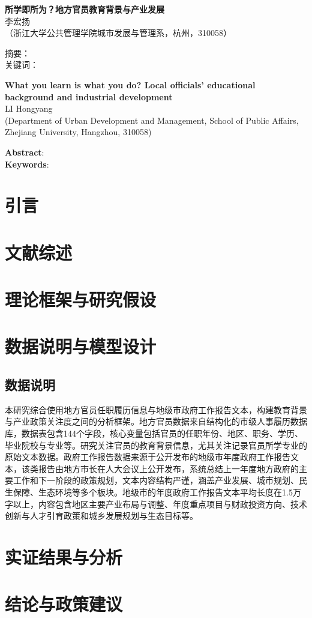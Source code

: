 \documentclass[a4paper,11pt, fontset=fandol]{ctexart}
\newcommand*{\TNR}{\CJKfamily{TNR}}
\newcommand{\sanhao}{\fontsize{15.75pt}{\baselineskip}\selectfont}
\newcommand{\sihao}{\fontsize{14pt}{\baselineskip}\selectfont}
\newcommand{\wuhao}{\fontsize{10.5pt}{\baselineskip}\selectfont}
\begin{document}
\begin{center}
\textbf{\sanhao 所学即所为？地方官员教育背景与产业发展} \\
\kaishu \wuhao 李宏扬 \\
\songti （浙江大学公共管理学院城市发展与管理系，杭州，310058）\\
\end{center}
\heiti \noindent 摘要： \songti \\
\heiti \noindent 关键词：\songti 


\begin{center}
\textbf{\TNR\sihao What you learn is what you do? Local officials' educational background and industrial development} \\
\wuhao LI Hongyang \\
(Department of Urban Development and Management, School of Public Affairs, Zhejiang University, Hangzhou, 310058) 
\end{center}
\noindent \textbf{Abstract}: \\
\noindent \textbf{Keywords}: 

\newpage
\tableofcontents
\newpage
\songti

\section{引言}

\section{文献综述}

\section{理论框架与研究假设}

\section{数据说明与模型设计}
\subsection{数据说明}
本研究综合使用地方官员任职履历信息与地级市政府工作报告文本，构建教育背景与产业政策关注度之间的分析框架。地方官员数据来自结构化的市级人事履历数据库，数据表包含144个字段，核心变量包括官员的任职年份、地区、职务、学历、毕业院校与专业等。研究关注官员的教育背景信息，尤其关注记录官员所学专业的原始文本数据。政府工作报告数据来源于公开发布的地级市年度政府工作报告文本，该类报告由地方市长在人大会议上公开发布，系统总结上一年度地方政府的主要工作和下一阶段的政策规划，文本内容结构严谨，涵盖产业发展、城市规划、民生保障、生态环境等多个板块。地级市的年度政府工作报告文本平均长度在1.5万字以上，内容包含地区主要产业布局与调整、年度重点项目与财政投资方向、技术创新与人才引育政策和城乡发展规划与生态目标等。

\section{实证结果与分析}

\section{结论与政策建议}
\end{document}
